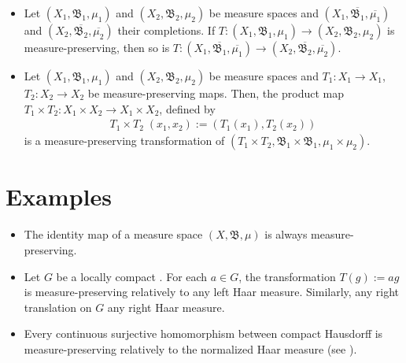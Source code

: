 \documentclass{article}
\begin{document}
\begin{itemize}
\item Let $(X_1, \mathfrak{B}_1, \mu_1)$ and $(X_2, \mathfrak{B}_2, \mu_2)$ be measure spaces and $(X_1, \overline{\mathfrak{B}_1}, \overline{\mu_1})$ and $(X_2, \overline{\mathfrak{B}_2}, \overline{\mu_2})$ their completions. If $T:(X_1, \mathfrak{B}_1, \mu_1) \longrightarrow (X_2, \mathfrak{B}_2, \mu_2)$ is measure-preserving, then so is $T:(X_1, \overline{\mathfrak{B}_1}, \overline{\mu_1}) \longrightarrow (X_2, \overline{\mathfrak{B}_2}, \overline{\mu_2})$. 
\end{itemize}

\begin{itemize}
\item Let $(X_1, \mathfrak{B}_1, \mu_1)$ and $(X_2, \mathfrak{B}_2, \mu_2)$ be measure spaces and $T_1:X_1 \longrightarrow X_1$, $T_2:X_2 \longrightarrow X_2$ be measure-preserving maps. Then, the product map $T_1 \times T_2 : X_1 \times X_2 \longrightarrow X_1 \times X_2$, defined by
\begin{align*}
T_1 \times T_2 \;(x_1, x_2) := (T_1(x_1), T_2(x_2))
\end{align*}
is a measure-preserving transformation of $(T_1 \times T_2, \mathfrak{B}_1 \times \mathfrak{B}_1, \mu_1 \times \mu_2)$.
\end{itemize}


\section{Examples}

\begin{itemize}
\item The identity map of a measure space $(X, \mathfrak{B}, \mu)$ is always measure-preserving.
\end{itemize}
\begin{itemize}
\item Let $G$ be a locally compact . For each $a \in G$, the transformation $T(g):=ag$ is measure-preserving relatively to any left Haar measure. Similarly, any right translation on $G$  any right Haar measure.
\end{itemize}
\begin{itemize}
\item Every continuous surjective homomorphism between compact Hausdorff  is measure-preserving relatively to the normalized Haar measure (see ).
\end{itemize}
\end{document}
